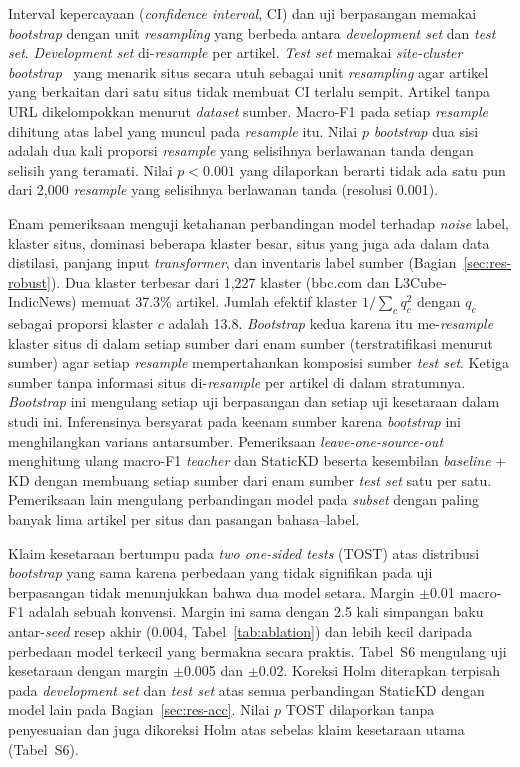 \documentclass{ieeeaccess}
\newcommand{\en}[1]{\textit{#1}}
\begin{document}
Interval kepercayaan (\en{confidence interval}, CI) dan uji berpasangan memakai \en{bootstrap} dengan unit \en{resampling} yang berbeda antara \en{development set} dan \en{test set}. \en{Development set} di-\en{resample} per artikel. \en{Test set} memakai \en{site-cluster bootstrap}~\cite{field2007bootstrapping} yang menarik situs secara utuh sebagai unit \en{resampling} agar artikel yang berkaitan dari satu situs tidak membuat CI terlalu sempit. Artikel tanpa URL dikelompokkan menurut \en{dataset} sumber. Macro-F1 pada setiap \en{resample} dihitung atas label yang muncul pada \en{resample} itu. Nilai $p$ \en{bootstrap} dua sisi adalah dua kali proporsi \en{resample} yang selisihnya berlawanan tanda dengan selisih yang teramati. Nilai $p<0.001$ yang dilaporkan berarti tidak ada satu pun dari 2,000 \en{resample} yang selisihnya berlawanan tanda (resolusi 0.001).

Enam pemeriksaan menguji ketahanan perbandingan model terhadap \en{noise} label, klaster situs, dominasi beberapa klaster besar, situs yang juga ada dalam data distilasi, panjang input \en{transformer}, dan inventaris label sumber (Bagian~\ref{sec:res-robust}). Dua klaster terbesar dari 1,227 klaster (bbc.com dan L3Cube-IndicNews) memuat 37.3\% artikel. Jumlah efektif klaster $1/\sum_c q_c^{2}$ dengan $q_c$ sebagai proporsi klaster $c$ adalah 13.8. \en{Bootstrap} kedua karena itu me-\en{resample} klaster situs di dalam setiap sumber dari enam sumber (terstratifikasi menurut sumber) agar setiap \en{resample} mempertahankan komposisi sumber \en{test set}. Ketiga sumber tanpa informasi situs di-\en{resample} per artikel di dalam stratumnya. \en{Bootstrap} ini mengulang setiap uji berpasangan dan setiap uji kesetaraan dalam studi ini. Inferensinya bersyarat pada keenam sumber karena \en{bootstrap} ini menghilangkan varians antarsumber. Pemeriksaan \en{leave-one-source-out} menghitung ulang macro-F1 \en{teacher} dan StaticKD beserta kesembilan \en{baseline} + KD dengan membuang setiap sumber dari enam sumber \en{test set} satu per satu. Pemeriksaan lain mengulang perbandingan model pada \en{subset} dengan paling banyak lima artikel per situs dan pasangan bahasa--label.

Klaim kesetaraan bertumpu pada \en{two one-sided tests} (TOST) atas distribusi \en{bootstrap} yang sama karena perbedaan yang tidak signifikan pada uji berpasangan tidak menunjukkan bahwa dua model setara. Margin $\pm$0.01 macro-F1 adalah sebuah konvensi. Margin ini sama dengan 2.5 kali simpangan baku antar-\en{seed} resep akhir (0.004, Tabel~\ref{tab:ablation}) dan lebih kecil daripada perbedaan model terkecil yang bermakna secara praktis. Tabel~S6 mengulang uji kesetaraan dengan margin $\pm$0.005 dan $\pm$0.02. Koreksi Holm diterapkan terpisah pada \en{development set} dan \en{test set} atas semua perbandingan StaticKD dengan model lain pada Bagian~\ref{sec:res-acc}. Nilai $p$ TOST dilaporkan tanpa penyesuaian dan juga dikoreksi Holm atas sebelas klaim kesetaraan utama (Tabel~S6).
\end{document}
